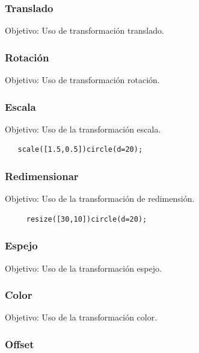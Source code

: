 \documentclass{article}
\begin{document}
\subsubsection{Translado}

Objetivo: Uso de transformación translado.\citep{OpenSCS}\\

\subsubsection{Rotación}

Objetivo: Uso de transformación rotación. \citep{OpenSCS}\\

\subsubsection{Escala}

Objetivo: Uso de la transformación escala.\citep{OpenSCS}\\

\begin{verbatim}
   scale([1.5,0.5])circle(d=20);
\end{verbatim}

\subsubsection{Redimensionar}

Objetivo: Uso de la transformación de redimensión.\citep{OpenSCS}\\

\begin{verbatim}
     resize([30,10])circle(d=20);
\end{verbatim}

\subsubsection{Espejo}

Objetivo: Uso de la transformación espejo.\citep{OpenSCS}\\

\subsubsection{Color}

Objetivo: Uso de la transformación color.\citep{OpenSCS}\\

\subsubsection{Offset}
\end{document}
